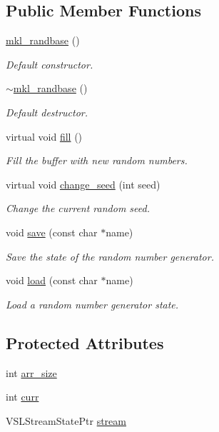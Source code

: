 \subsection*{Public Member Functions}
\begin{DoxyCompactItemize}
\item 
\hyperlink{classmkl__randbase_a9f096a27eebdfc79087e5e8899ed98c9}{mkl\+\_\+randbase} ()
\begin{DoxyCompactList}\small\item\em Default constructor. \end{DoxyCompactList}\item 
\hyperlink{classmkl__randbase_a95dd980c910854915934afead27d832e}{$\sim$mkl\+\_\+randbase} ()
\begin{DoxyCompactList}\small\item\em Default destructor. \end{DoxyCompactList}\item 
virtual void \hyperlink{classmkl__randbase_ada678ebb272b395d7e2474a98bae503a}{fill} ()
\begin{DoxyCompactList}\small\item\em Fill the buffer with new random numbers. \end{DoxyCompactList}\item 
virtual void \hyperlink{classmkl__randbase_a12799fa4a3d1c9d14431bc1dc6ed38fa}{change\+\_\+seed} (int seed)
\begin{DoxyCompactList}\small\item\em Change the current random seed. \end{DoxyCompactList}\item 
void \hyperlink{classmkl__randbase_a62dd2d59a3b339680c2d29822e44efa5}{save} (const char $\ast$name)
\begin{DoxyCompactList}\small\item\em Save the state of the random number generator. \end{DoxyCompactList}\item 
void \hyperlink{classmkl__randbase_a5ebfdc1a7f661a36341d21676750e23f}{load} (const char $\ast$name)
\begin{DoxyCompactList}\small\item\em Load a random number generator state. \end{DoxyCompactList}\end{DoxyCompactItemize}
\subsection*{Protected Attributes}
\begin{DoxyCompactItemize}
\item 
int \hyperlink{classmkl__randbase_ae4fd17554da931b8d268f43b5c21f49b}{arr\+\_\+size}
\item 
int \hyperlink{classmkl__randbase_af654ef714fc77af1d4d815956034d130}{curr}
\item 
V\+S\+L\+Stream\+State\+Ptr \hyperlink{classmkl__randbase_a130663e1e2c17ec4a7b77b3c2a6aa1d6}{stream}
\end{DoxyCompactItemize}


